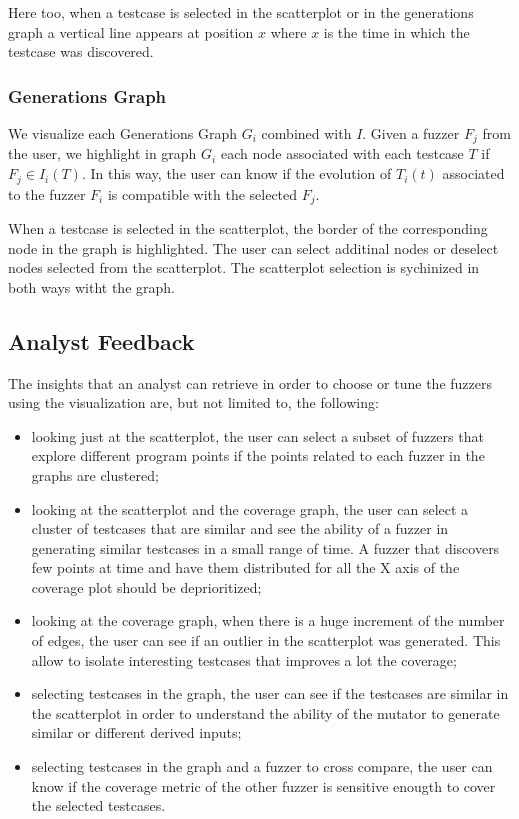 \documentclass[conference,compsoc]{IEEEtran}
\begin{document}
Here too, when a testcase is selected in the scatterplot or in the generations graph a vertical line appears at position $x$ where $x$ is the time in which the testcase was discovered.

\subsubsection{Generations Graph}

We visualize each Generations Graph $G_i$ combined with $I$. Given a fuzzer $F_j$ from the user, we highlight in graph $G_i$ each node associated with each testcase $T$ if $F_j \in I_i(T)$. In this way, the user can know if the evolution of $T_i(t)$ associated to the fuzzer $F_i$ is compatible with the selected $F_j$.

When a testcase is selected in the scatterplot, the border of the corresponding node in the graph is highlighted. The user can select additinal nodes or deselect nodes selected from the scatterplot. The scatterplot selection is sychinized in both ways witht the graph.

\subsection{Analyst Feedback}

The insights that an analyst can retrieve in order to choose or tune the fuzzers using the visualization are, but not limited to, the following:

\begin{itemize}
\item looking just at the scatterplot, the user can select a subset of fuzzers that explore different program points if the points related to each fuzzer in the graphs are clustered;
\item looking at the scatterplot and the coverage graph, the user can select a cluster of testcases that are similar and see the ability of a fuzzer in generating similar testcases in a small range of time. A fuzzer that discovers few points at time and have them distributed for all the X axis of the coverage plot should be deprioritized;
\item looking at the coverage graph, when there is a huge increment of the number of edges, the user can see if an outlier in the scatterplot was generated. This allow to isolate interesting testcases that improves a lot the coverage;
\item selecting testcases in the graph, the user can see if the testcases are similar in the scatterplot in order to understand the ability of the mutator to generate similar or different derived inputs;
\item selecting testcases in the graph and a fuzzer to cross compare, the user can know if the coverage metric of the other fuzzer is sensitive enougth to cover the selected testcases.
\end{itemize}
\end{document}
